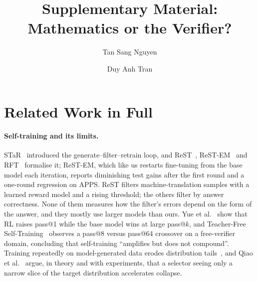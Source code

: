 \documentclass[runningheads]{llncs}
\begin{document}
\title{Supplementary Material: Mathematics or the Verifier?}
\author{Tan Sang Nguyen \and Duy Anh Tran}
\maketitle

\appendix

\section{Related Work in Full}
\label{app:related}

\paragraph{Self-training and its limits.}
STaR~\cite{ref_star} introduced the generate--filter--retrain loop, and
ReST~\cite{ref_rest}, ReST-EM~\cite{ref_restem} and RFT~\cite{ref_rft} formalise
it; ReST-EM, which like us restarts fine-tuning from the base model each
iteration, reports diminishing test gains after the first round and a one-round
regression on APPS. ReST filters machine-translation samples with a learned
reward model and a rising threshold; the others filter by answer correctness.
None of them measures how the filter's errors depend on the form of the answer,
and they mostly use larger models than ours. Yue et al.~\cite{ref_rllimit} show that RL
raises pass@1 while the base model wins at large pass@$k$, and Teacher-Free
Self-Training~\cite{ref_teacherfree} observes a pass@8 versus pass@64 crossover on
a free-verifier domain, concluding that self-training ``amplifies but does not
compound''. Training repeatedly on model-generated data erodes distribution
tails~\cite{ref_collapse}, and Qiao et al.~\cite{ref_selectionbias} argue,
in theory and with experiments, that a selector seeing only a narrow slice of
the target distribution accelerates collapse.
\end{document}
